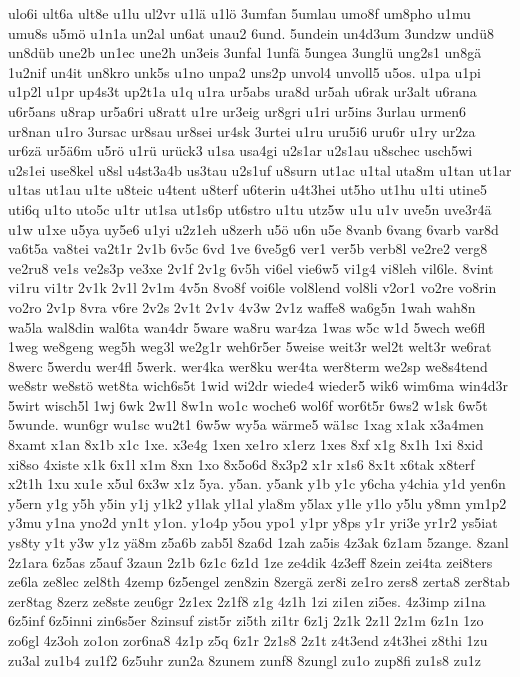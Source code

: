 {ulo6i ult6a ult8e u1lu ul2vr u1l\"a u1l\"o 3umfan 5umlau umo8f
um8pho u1mu umu8s u5m\"o u1n1a un2al un6at unau2 6und.  5undein
un4d3um 3undzw und\"u8 un8d\"ub une2b un1ec une2h un3eis 3unfal
1unf\"a 5ungea 3ungl\"u ung2s1 un8g\"a 1u2nif un4it un8kro
unk5s u1no unpa2 uns2p unvol4 unvoll5 u5os.  u1pa u1pi u1p2l u1pr
up4s3t up2t1a u1q u1ra ur5abs ura8d ur5ah u6rak ur3alt u6rana u6r5ans
u8rap ur5a6ri u8ratt u1re ur3eig ur8gri u1ri ur5ins 3urlau urmen6
ur8nan u1ro 3ursac ur8sau ur8sei ur4sk 3urtei u1ru uru5i6 uru6r u1ry
ur2za ur6z\"a ur5\"a6m u5r\"o u1r\"u ur\"uck3 u1sa
usa4gi u2s1ar u2s1au u8schec usch5wi u2s1ei use8kel u8sl u4st3a4b
us3tau 
u2s1uf u8surn ut1ac u1tal uta8m u1tan ut1ar u1tas ut1au
u1te u8teic u4tent u8terf u6terin u4t3hei ut5ho ut1hu u1ti utine5
uti6q u1to uto5c u1tr ut1sa ut1s6p ut6stro u1tu utz5w u1u u1v uve5n
uve3r4\"a u1w u1xe u5ya uy5e6 u1yi u2z1eh u8zerh u5\"o u\sse6n
 u\ssen5e  8vanb 6vang 6varb var8d va6t5a va8tei
va2t1r 2v1b 6v5c 6vd 1ve 6ve5g6 ver1 ver5b verb8l ve2re2 verg8 ve2ru8
ve1s ve2s3p ve3xe 2v1f 2v1g 6v5h vi6el vie6w5 vi1g4 vi8leh vil6le.
8vint vi1ru vi1tr 2v1k 2v1l 2v1m 4v5n 8vo8f voi6le vol8lend vol8li
v2or1 vo2re vo8rin vo2ro 2v1p 8vra v6re 
2v2s %
2v1t 2v1v 4v3w 2v1z
waffe8 wa6g5n 1wah wah8n wa5la wal8din wal6ta wan4dr 5ware wa8ru
war4za 1was w5c w1d 5wech we6fl 1weg we8geng weg5h weg3l we2g1r
weh6r5er 5weise weit3r wel2t welt3r we6rat 8werc 5werdu wer4fl 5werk.
wer4ka wer8ku wer4ta wer8term we2sp 
we8s4tend 
we8str
we8st\"o wet8ta wich6s5t 1wid wi2dr wiede4 wieder5 wik6 wim6ma
win4d3r 5wirt wisch5l 1wj 6wk 2w1l 8w1n wo1c woche6 wol6f wor6t5r 6ws2
w1sk 6w5t 5wunde.  wun6gr wu1sc wu2t1 6w5w wy5a w\"arme5 w\"a1sc
1xag x1ak x3a4men 8xamt x1an 8x1b x1c 1xe.  x3e4g 1xen xe1ro x1erz
1xes 8xf x1g 8x1h 1xi 8xid xi8so 4xiste x1k 6x1l x1m 8xn 1xo 8x5o6d
8x3p2 x1r x1s6 8x1t x6tak x8terf x2t1h 1xu xu1e x5ul 6x3w x1z 5ya.
y5an.  y5ank y1b y1c y6cha y4chia y1d yen6n y5ern y1g y5h y5in y1j
y1k2 y1lak yl1al yla8m y5lax y1le y1lo y5lu y8mn ym1p2 y3mu y1na yno2d
yn1t y1on.  y1o4p y5ou ypo1 y1pr y8ps y1r yri3e yr1r2 
ys5iat ys8ty
y1t y3w y1z y\"a8m z5a6b zab5l 8za6d 1zah za5is 4z3ak 6z1am 5zange.
8zanl 2z1ara 6z5as z5auf 3zaun 2z1b 6z1c 6z1d 1ze ze4dik 4z3eff 8zein
zei4ta zei8ters ze6la ze8lec zel8th 4zemp 6z5engel zen8zin 8zerg\"a
zer8i ze1ro zers8 zerta8 zer8tab zer8tag 8zerz ze8ste zeu6gr 2z1ex
2z1f8 z1g 4z1h 1zi zi1en zi5es.  4z3imp zi1na 6z5inf 6z5inni zin6s5er
8zinsuf zist5r zi5th zi1tr 6z1j 2z1k 2z1l 2z1m 6z1n 1zo zo6gl 4z3oh
zo1on zor6na8 4z1p z5q 6z1r 2z1s8 2z1t z4t3end z4t3hei z8thi 1zu zu3al
zu1b4 zu1f2 6z5uhr zun2a 8zunem zunf8 8zungl zu1o zup8fi zu1s8 zu1z
}
